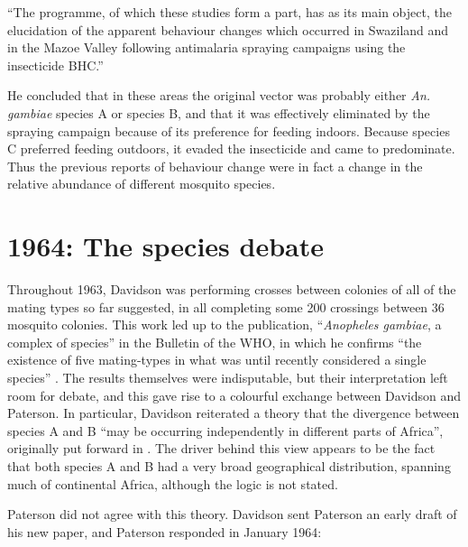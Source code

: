 \documentclass[a4paper,11pt,abstracton,hidelinks]{scrartcl}
\begin{document}
\begin{displayquote}
``The programme, of which these studies form a part, has as its main object, the elucidation of the apparent behaviour changes which occurred in Swaziland and in the Mazoe Valley following antimalaria spraying campaigns using the insecticide BHC.'' \citep{Paterson1963b}
\end{displayquote}


He concluded that in these areas the original vector was probably either \textit{An. gambiae} species A or species B, and that it was effectively eliminated by the spraying campaign because of its preference for feeding indoors. Because species C preferred feeding outdoors, it evaded the insecticide and came to predominate. Thus the previous reports of behaviour change were in fact a change in the relative abundance of different mosquito species.


\section{1964: The species debate}


Throughout 1963, Davidson was performing crosses between colonies of all of the mating types so far suggested, in all completing some 200 crossings between 36 mosquito colonies. 
This work led up to the publication, ``\textit{Anopheles gambiae}, a complex of species'' in the Bulletin of the WHO, in which he confirms ``the existence of five mating-types in what was until recently considered a single species'' \citep{Davidson1964}. 
The results themselves were indisputable, but their interpretation left room for debate, and this gave rise to a colourful exchange between Davidson and Paterson. 
In particular, Davidson reiterated a theory that the divergence between species A and B ``may be occurring independently in different parts of Africa'', originally put forward in \citet{Davidson1962a}. 
The driver behind this view appears to be the fact that both species A and B had a very broad geographical distribution, spanning much of continental Africa, although the logic is not stated.


Paterson did not agree with this theory. Davidson sent Paterson an early draft of his new paper, and Paterson responded in January 1964:
\end{document}
